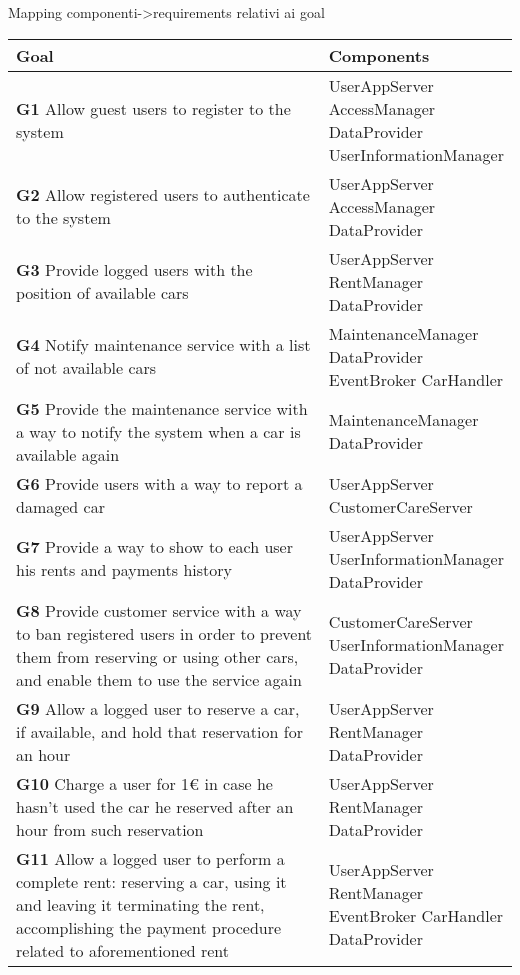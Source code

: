 Mapping componenti->requirements relativi ai goal
\begin{longtable}{p{0.7\linewidth}p{0.3\linewidth}}
\toprule
\textbf{Goal} & \textbf{Components}\\
\midrule
\textbf{G1} Allow guest users to register to the system & \mbox{UserAppServer} \mbox{AccessManager} \mbox{DataProvider} \mbox{UserInformationManager}\\
\midrule
\textbf{G2} Allow registered users to authenticate to the system & \mbox{UserAppServer} \mbox{AccessManager} \mbox{DataProvider}\\
\midrule
\textbf{G3} Provide logged users with the position of available cars & \mbox{UserAppServer} \mbox{RentManager} \mbox{DataProvider}\\
\midrule
\textbf{G4} Notify maintenance service with a list of not available cars & \mbox{MaintenanceManager} \mbox{DataProvider}  \mbox{EventBroker} \mbox{CarHandler}\\
\midrule
\textbf{G5} Provide the maintenance service with a way to notify the system when a car is available again & \mbox{MaintenanceManager} \mbox{DataProvider}\\
\midrule
\textbf{G6} Provide users with a way to report a damaged car & \mbox{UserAppServer} \mbox{CustomerCareServer}\\
\midrule
\textbf{G7} Provide a way to show to each user his rents and payments history & \mbox{UserAppServer} \mbox{UserInformationManager} \mbox{DataProvider}\\
\midrule
\textbf{G8} Provide customer service with a way to ban registered users in order to prevent them from reserving or using other cars, and enable them to use the service again & \mbox{CustomerCareServer} \mbox{UserInformationManager} \mbox{DataProvider}\\
\midrule
\textbf{G9} Allow a logged user to reserve a car, if available, and hold that reservation for an hour & \mbox{UserAppServer} \mbox{RentManager} \mbox{DataProvider}\\
\midrule
\textbf{G10} Charge a user for 1\euro{} in case he hasn't used the car he reserved after an hour from such reservation & \mbox{UserAppServer} \mbox{RentManager} \mbox{DataProvider}\\
\midrule
\textbf{G11} Allow a logged user to perform a complete rent: reserving a car, using it and leaving it terminating the rent, accomplishing the payment procedure related to aforementioned rent & \mbox{UserAppServer} \mbox{RentManager} \mbox{EventBroker} \mbox{CarHandler} \mbox{DataProvider}\\

\end{longtable}
